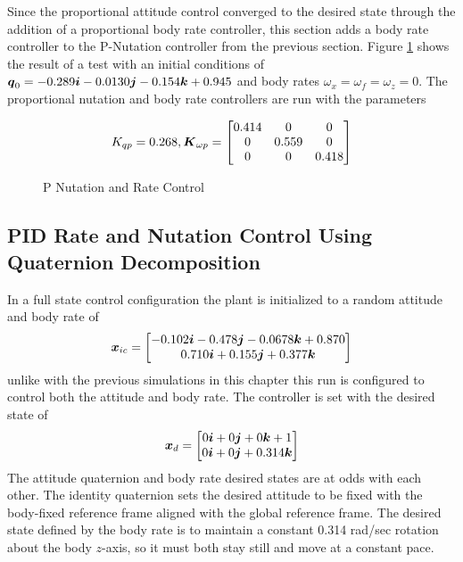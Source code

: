 Since the proportional attitude control converged to the desired state through the addition of a proportional body rate controller, this section adds a body rate controller to the P-Nutation controller from the previous section.  Figure \ref{fig:PNutationRateControl} shows the result of a test with an initial conditions of $\boldsymbol{q}_0 = -0.289\boldsymbol{i} -0.0130 \boldsymbol{j} -0.154 \boldsymbol{k} + 0.945$ and body rates $\omega_x = \omega_f = \omega_z = 0$.  The proportional nutation and body rate controllers are run with the parameters

\begin{equation}
  K_{qp} = 0.268, \boldsymbol{K}_{\omega p} = \begin{bmatrix} 0.414 & 0 & 0 \\ 0 & 0.559 & 0 \\ 0 & 0 & 0.418 \end{bmatrix}
\end{equation}

\begin{figure}[H]
  \centerline{}
  \caption{P Nutation and Rate Control}
  \label{fig:PNutationRateControl}
\end{figure}

\subsection{PID Rate and Nutation Control Using Quaternion Decomposition}
\label{subsec:PIDRateandNutationControl}
In a full state control configuration the plant is initialized to a random attitude and body rate of
\begin{equation}
  \boldsymbol{x}_{ic} = \begin{bmatrix} -0.102 \boldsymbol{i} -0.478 \boldsymbol{j}-0.0678 \boldsymbol{k} + 0.870 \\ 0.710 \boldsymbol{i} + 0.155 \boldsymbol{j} + 0.377 \boldsymbol{k} \end{bmatrix}
\end{equation}
unlike with the previous simulations in this chapter this run is configured to control both the attitude and body rate.  The controller is set with the desired state of
\begin{equation}
  \boldsymbol{x}_d = \begin{bmatrix} 0 \boldsymbol{i} +0 \boldsymbol{j} +0 \boldsymbol{k} + 1 \\ 0 \boldsymbol{i} + 0 \boldsymbol{j} + 0.314 \boldsymbol{k} \end{bmatrix}
\end{equation}
The attitude quaternion and body rate desired states are at odds with each other.  The identity quaternion sets the desired attitude to be fixed with the body-fixed reference frame aligned with the global reference frame.  The desired state defined by the body rate is to maintain a constant 0.314 rad/sec rotation about the body $z$-axis, so it must both stay still and move at a constant pace.

